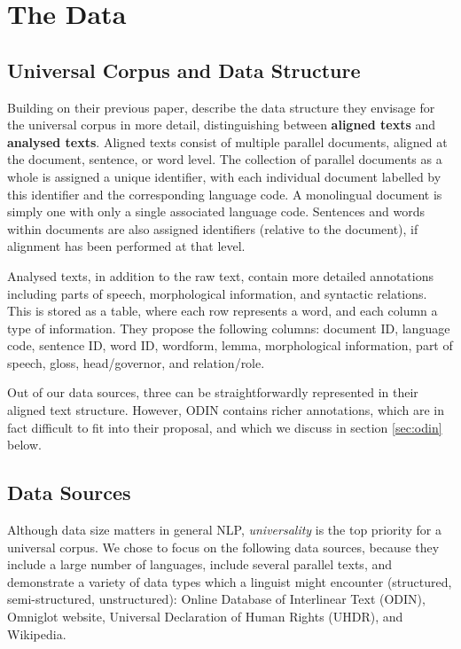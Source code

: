 \section{The Data}\label{sec:data}



\subsection{Universal Corpus and Data Structure} \label{sec:structure}

Building on their previous paper,  describe the data structure they envisage for the universal corpus in more detail, distinguishing between \textbf{aligned texts} and \textbf{analysed texts}. Aligned texts consist of multiple parallel documents, aligned at the document, sentence, or word level. The collection of parallel documents as a whole is assigned a unique identifier, with each individual document labelled by this identifier and the corresponding language code.  A monolingual document is simply one with only a single associated language code.  Sentences and words within documents are also assigned identifiers (relative to the document), if alignment has been performed at that level.

Analysed texts, in addition to the raw text, contain more detailed annotations including parts of speech, morphological information, and syntactic relations.  This is stored as a table, where each row represents a word, and each column a type of information.  They propose the following columns: document ID, language code, sentence ID, word ID, wordform, lemma, morphological information, part of speech, gloss, head/governor, and relation/role.

Out of our data sources, three can be straightforwardly represented in their aligned text structure.  However, ODIN contains richer annotations, which are in fact difficult to fit into their proposal, and which we discuss in section \ref{sec:odin} below.


\subsection{Data Sources} \label{sec:sources}

Although data size matters in general NLP, \emph{universality} is the top priority for a universal corpus. We chose to focus on the following data sources, because they include a large number of languages, include several parallel texts, and demonstrate a variety of data types which a linguist might encounter (structured, semi-structured, unstructured): Online Database of Interlinear Text (ODIN), Omniglot website, Universal Declaration of Human Rights (UHDR), and Wikipedia.

